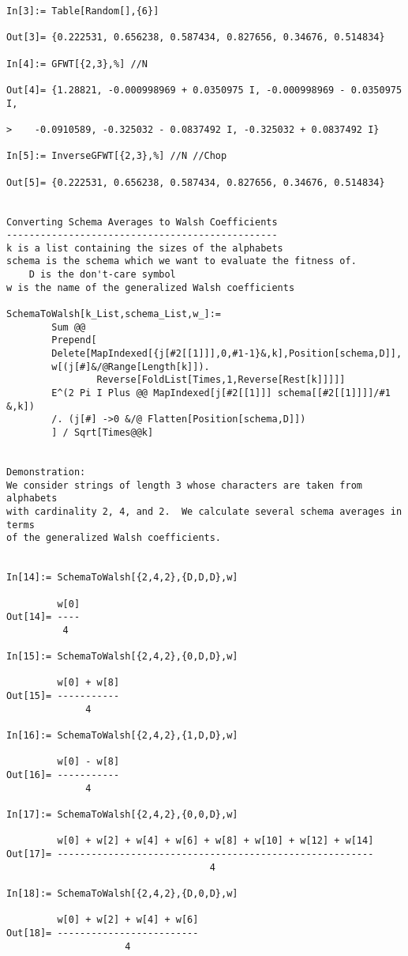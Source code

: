 \begin{verbatim}
In[3]:= Table[Random[],{6}]

Out[3]= {0.222531, 0.656238, 0.587434, 0.827656, 0.34676, 0.514834}

In[4]:= GFWT[{2,3},%] //N

Out[4]= {1.28821, -0.000998969 + 0.0350975 I, -0.000998969 - 0.0350975 I, 
 
>    -0.0910589, -0.325032 - 0.0837492 I, -0.325032 + 0.0837492 I}

In[5]:= InverseGFWT[{2,3},%] //N //Chop

Out[5]= {0.222531, 0.656238, 0.587434, 0.827656, 0.34676, 0.514834}


Converting Schema Averages to Walsh Coefficients
------------------------------------------------
k is a list containing the sizes of the alphabets
schema is the schema which we want to evaluate the fitness of.
	D is the don't-care symbol
w is the name of the generalized Walsh coefficients

SchemaToWalsh[k_List,schema_List,w_]:=
        Sum @@
        Prepend[
        Delete[MapIndexed[{j[#2[[1]]],0,#1-1}&,k],Position[schema,D]],
        w[(j[#]&/@Range[Length[k]]).
                Reverse[FoldList[Times,1,Reverse[Rest[k]]]]]
        E^(2 Pi I Plus @@ MapIndexed[j[#2[[1]]] schema[[#2[[1]]]]/#1 &,k])
        /. (j[#] ->0 &/@ Flatten[Position[schema,D]])
        ] / Sqrt[Times@@k]


Demonstration:
We consider strings of length 3 whose characters are taken from alphabets
with cardinality 2, 4, and 2.  We calculate several schema averages in terms 
of the generalized Walsh coefficients.


In[14]:= SchemaToWalsh[{2,4,2},{D,D,D},w]

         w[0]
Out[14]= ----
          4

In[15]:= SchemaToWalsh[{2,4,2},{0,D,D},w]

         w[0] + w[8]
Out[15]= -----------
              4

In[16]:= SchemaToWalsh[{2,4,2},{1,D,D},w]

         w[0] - w[8]
Out[16]= -----------
              4

In[17]:= SchemaToWalsh[{2,4,2},{0,0,D},w]

         w[0] + w[2] + w[4] + w[6] + w[8] + w[10] + w[12] + w[14]
Out[17]= --------------------------------------------------------
                                    4

In[18]:= SchemaToWalsh[{2,4,2},{D,0,D},w]

         w[0] + w[2] + w[4] + w[6]
Out[18]= -------------------------
                     4



\end{verbatim}

